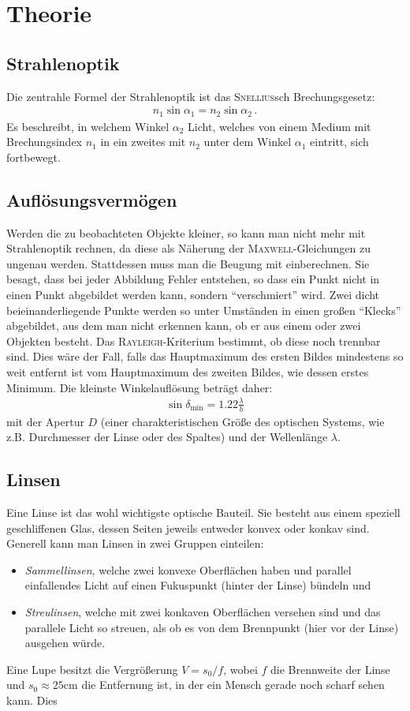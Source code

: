 \documentclass[12pt,a4paper,titlepage,headinclude,bibtotoc]{scrartcl}
\begin{document}
\cite{lp18}
\section{Theorie}
\label{sec:theorie}
\subsection{Strahlenoptik}
Die zentrahle Formel der Strahlenoptik ist das \textsc{Snellius}sch Brechungsgesetz:
\begin{align}
	n_1 \sin \alpha_1=n_2\sin\alpha_2\, .
\end{align}
Es beschreibt, in welchem Winkel $\alpha_2$ Licht, welches von einem Medium mit Brechungsindex $n_1$ in ein zweites mit $n_2$ unter dem Winkel $\alpha_1$ eintritt, sich fortbewegt.

\subsection{Auflösungsvermögen}
Werden die zu beobachteten Objekte kleiner, so kann man nicht mehr mit Strahlenoptik rechnen, da diese als Näherung der \textsc{Maxwell}-Gleichungen zu ungenau werden.
Stattdessen muss man die Beugung mit einberechnen.
Sie besagt, dass bei jeder Abbildung Fehler entstehen, so dass ein Punkt nicht in einen Punkt abgebildet werden kann, sondern "`verschmiert"' wird.
Zwei dicht beieinanderliegende Punkte werden so unter Umständen in einen großen "`Klecks"' abgebildet, aus dem man nicht erkennen kann, ob er aus einem oder zwei Objekten besteht.
Das \textsc{Rayleigh}-Kriterium bestimmt, ob diese noch trennbar sind.
Dies wäre der Fall, falls das Hauptmaximum des ersten Bildes mindestens so weit entfernt ist vom Hauptmaximum des zweiten Bildes, wie dessen erstes Minimum.
Die kleinste Winkelauflösung beträgt daher:
\begin{align}
	\sin\delta_\text{min}=1.22\frac{\lambda}{b}
\end{align}
mit der Apertur $D$ (einer charakteristischen Größe des optischen Systems, wie z.B. Durchmesser der Linse oder des Spaltes) und der Wellenlänge $\lambda$.

\subsection{Linsen}
Eine Linse ist das wohl wichtigste optische Bauteil.
Sie besteht aus einem speziell geschliffenen Glas, dessen Seiten jeweils entweder konvex oder konkav sind.
Generell kann man Linsen in zwei Gruppen einteilen:
\begin{itemize}
\item \emph{Sammellinsen}, welche zwei konvexe Oberflächen haben und parallel einfallendes Licht auf einen Fukuspunkt (hinter der Linse) bündeln und
\item \emph{Streulinsen}, welche mit zwei konkaven Oberflächen versehen sind und das parallele Licht so streuen, als ob es von dem Brennpunkt (hier vor der Linse) ausgehen würde.
\end{itemize}
Eine Lupe besitzt die Vergrößerung $V=s_0/f$, wobei $f$ die Brennweite der Linse und $s_0\approx 25\si{\centi\meter}$ die Entfernung ist, in der ein Mensch gerade noch scharf sehen kann.
Dies 
\end{document}
